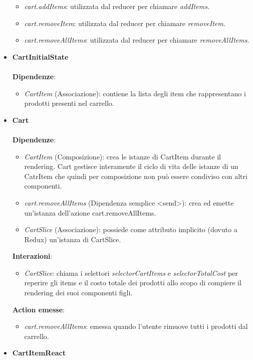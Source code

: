 \begin{itemize}
\begin{itemize}
			\item \textit{cart.addItems}: utilizzata dal reducer per chiamare \textit{addItems}.
			\item \textit{cart.removeItem}: utilizzata dal reducer per chiamare \textit{removeItem}.
			\item \textit{cart.removeAllItems}: utilizzata dal reducer per chiamare \textit{removeAllItems}.
		\end{itemize}
		\item \textbf{CartInitialState}
		\\\\
		\textbf{Dipendenze}: 
		\begin{itemize}
			\item \textit{CartItem} (Associazione): contiene la lista degli item che rappresentano i prodotti presenti nel carrello.
		\end{itemize} 
		\item \textbf{Cart}
		\\\\
		\textbf{Dipendenze}:
		\begin{itemize}
		\item \textit{CartItem} (Composizione): crea le istanze di CartItem durante il rendering.
		Cart gestisce interamente il ciclo di vita delle istanze di un CatrItem che quindi per composizione
		non può essere condiviso con altri componenti.
		\item \textit{cart.removeAllItems} (Dipendenza semplice \textless send\textgreater): crea ed emette un'istanza dell'azione cart.removeAllItems.
		\item \textit{CartSlice} (Associazione): possiede come attributo implicito (dovuto a Redux) un'istanza di CartSlice.
	\end{itemize} 
	\textbf{Interazioni}:
	\begin{itemize}
		\item \textit{CartSlice}: chiama i selettori \textit{selectorCartItems} e \textit{selectorTotalCost} per reperire gli items e il costo totale dei prodotti 
		allo scopo di compiere il rendering dei suoi componenti figli.
	\end{itemize}
	\textbf{Action emesse}:
	\begin{itemize}
		\item \textit{cart.removeAllItems}: emessa quando l'utente rimuove tutti i prodotti dal carrello.
	\end{itemize}
	\item \textbf{CartItemReact}
	\\\\

\end{itemize}
